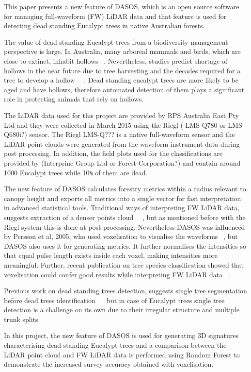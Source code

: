 \documentclass{subfiles}
\begin{document}
This paper presents a new feature of DASOS, which is an open source software for managing full-waveform (FW) LiDAR data and that feature is used for detecting dead standing Eucalypt trees in native Australian forests.

The value of dead standing Eucalypt trees from a biodiversity management perspective is large. In Australia, many arboreal mammals and birds, which are close to extinct, inhabit hollows ~\cite{Gibbons2002}. Nevertheless, studies predict shortage of hollows in the near future due to tree harvesting and the decades required for a tree to develop a hollow ~\cite{Lindenmayer2010}~\cite{Goldingay2009}. Dead standing eucalypt trees are more likely to be aged and have hollows, therefore automated detection of them plays a significant role in protecting animals that rely on hollows. 

The LiDAR data used for this project are provided by RPS Australia East Pty Ltd and they were collected in March 2015 using the Riegl ( LMS-Q780 or LMS-Q680i?) sensor. The Riegl LMS-Q??? is a native full-waveform sensor and the LiDAR point clouds were generated from the waveform instrument data during post processing. In addition, the field plots used for the classifications are provided by (Interprine Group Ltd or Forest Corporation?) and contain around 1000 Eucalypt trees while 10\verb|%| of them are dead. 

The new feature of DASOS calculates forestry metrics within a radius relevant to canopy height and exports all metrics into a single vector for fast interpretation in advanced statistical tools.  Traditional ways of interpreting FW LiDAR data, suggests extraction of a denser points cloud ~\cite{Neuenschwander2009}~\cite{Reitberger2008}, but as mentioned before with the Riegl system this is done at post processing. Nevertheless DASOS was influenced by Persson et al, 2005, who used voxelisation to visualise the waveforms ~\cite{Persson2005}, but DASOS also uses it for generating metrics. It further normalises the intensities so that equal pulse length exists inside each voxel, making intensities more meaningful. Further, recent publication on tree species classification showed that voxelisation could confer good results while interpreting FW LiDAR data ~\cite{Cao2016}. 

Previous work on dead standing trees detection, suggests single tree segmentation before dead trees identification ~\cite{Yao2012}~\cite{Polewski2015} but in case of Eucalypt trees single tree detection is a challenge on its own due to their irregular structure and multiple trunk splits. 

In this project, the new feature of DASOS is used for generating 3D signatures characterising dead standing Eucalypt trees and a comparison between the LiDAR point cloud and FW LiDAR data is performed using Random Forest to demonstrate the increased survey accuracy obtained with voxelisation.
\end{document}
